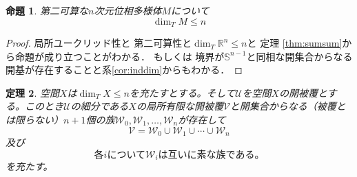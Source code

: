 \documentclass[leqno, a4paper, 12pt]{jsarticle}
\newtheorem{thm}{定理}
\newtheorem{prop}[thm]{命題}
\newcommand{\rr}{\mathbb{R}}
\begin{document}
\begin{prop}
第二可算な$n$次元位相多様体$M$について
\[
\dim_{T} M\le n
\]
\end{prop}
\begin{proof}
局所ユークリッド性と
第二可算性と$\dim_{T}\rr^{n}\le n$と
定理 \ref{thm:sumsum}から命題が成り立つことがわかる．
もしくは
境界が$\mathbb{S}^{n-1}$と同相な開集合からなる開基が存在することと系\ref{cor:inddim}からもわかる．
\end{proof}
\begin{thm}\label{main}
空間$X$は$\dim_{T} X\le n$を充たすとする。そして$\mathcal{U}$を空間$X$の開被覆とする。このとき$\mathcal{U}$の細分である$X$の局所有限な開被覆$\mathcal{V}$と開集合からなる（被覆とは限らない）$n+1$個の族$\mathcal{W}_0,\mathcal{W}_1,\dots,\mathcal{W}_n$が存在して
\[
\mathcal{V}=\mathcal{W}_0\cup\mathcal{W}_1\cup\cdots\cup\mathcal{W}_n
\]
及び
\[
\text{各$i$について$\mathcal{W}_i$は互いに素な族である。}
\]
を充たす。
\end{thm}
\end{document}
